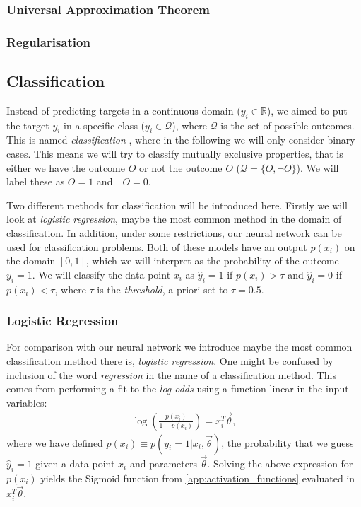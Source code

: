     \subsubsection{Universal Approximation Theorem}
            

    \subsubsection{Regularisation}

\subsection{Classification}
    Instead of predicting targets in a continuous domain ($y_i \in \mathbb{R}$), we aimed to put the target $y_i$ in a specific class ($y_i \in \mathcal{Q}$), where $\mathcal{Q}$ is the set of possible outcomes. This is named \textit{classification} , where in the following we will only consider binary cases. This means we will try to classify mutually exclusive properties, that is either we have the outcome $O$ or not the outcome $O$ ($\mathcal{Q} = \{O, \neg O\}$). We will label these as $O = 1$ and $\neg O = 0$.

    Two different methods for classification will be introduced here. Firstly we will look at \textit{logistic regression}, maybe the most common method in the domain of classification. In addition, under some restrictions, our neural network can be used for classification problems. Both of these models have an output $p(x_i)$ on the domain $[0,1]$, which we will interpret as the probability of the outcome $y_i = 1$. We will classify the data point $x_i$ as $\hat{y}_i = 1$ if $p(x_i) > \tau$ and $\hat{y}_i = 0$ if $p(x_i) < \tau$, where $\tau$ is the \textit{threshold}, a priori set to $\tau = 0.5$. 

    \subsubsection{Logistic Regression}
        For comparison with our neural network we introduce maybe the most common classification method there is, \textit{logistic regression}. One might be confused by inclusion of the word \textit{regression} in the name of a classification method. This comes from performing a fit to the \textit{log-odds} using a function linear in the input variables:
        \begin{align*}
            \log(\frac{p(x_i)}{1-p(x_i)}) = x_i^T \vec{\theta},
        \end{align*}
        where we have defined $p(x_i) \equiv p(y_i = 1 | x_i, \vec{\theta})$, the probability that we guess $\hat{y}_i = 1$ given a data point $x_i$ and parameters $\vec{\theta}$. Solving the above expression for $p(x_i)$ yields the Sigmoid function from \cref{app:activation_functions} evaluated in $x_i^T \vec{\theta}$. 
        
